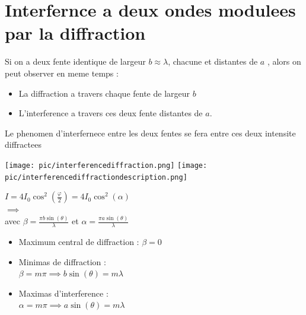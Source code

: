 \documentclass[12pt]{book}
\begin{document}
        \section{Interfernce a deux ondes modulees par la diffraction}
            Si on a deux fente identique de largeur $b \approx \lambda$, chacune et distantes de $a$ , alors on peut observer en meme temps :
            \begin{itemize}
                \item La diffraction a travers chaque fente de largeur $b$
                \item L'interference a travers ces deux fente distantes de $a$.
            \end{itemize}
            Le phenomen d'interfernece entre les deux fentes se fera entre ces deux intensite diffractees \\ 
           
            \begin{center}
                \begin{minipage}{0.5\linewidth}
                    \texttt{[image: pic/interferencediffraction.png]}
                    \texttt{[image: pic/interferencediffractiondescription.png]}
                \end{minipage}
                \begin{minipage}{0.49\linewidth}
                    $ I = 4I_0\cos^2(\frac{\varphi}{2})=4I_0\cos^2(\alpha) $\\
                    $\implies$\\
                    avec $\beta = \frac{\pi b \sin(\theta)}{\lambda}$ et $ \alpha = \frac{\pi a \sin(\theta)}{\lambda} $ 
                    \begin{itemize}
                        \item Maximum central de diffraction : $\beta = 0$
                        \item Minimas de diffraction : \\$\beta   =m\pi \implies b\sin(\theta)=m\lambda$
                        \item Maximas d'interference : \\$\alpha = m\pi \implies a\sin(\theta)=m\lambda$
                    \end{itemize}
                \end{minipage}
            \end{center}
        
\end{document}
